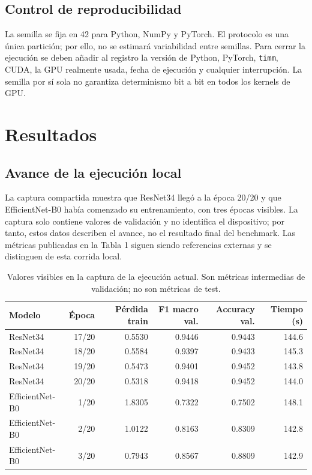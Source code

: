 \documentclass[11pt,a4paper]{article}
\begin{document}
\subsection{Control de reproducibilidad}
La semilla se fija en 42 para Python, NumPy y PyTorch. El protocolo es una única partición; por ello, no se estimará variabilidad entre semillas. Para cerrar la ejecución se deben añadir al registro la versión de Python, PyTorch, \texttt{timm}, CUDA, la GPU realmente usada, fecha de ejecución y cualquier interrupción. La semilla por sí sola no garantiza determinismo bit a bit en todos los kernels de GPU.

\section{Resultados}
\subsection{Avance de la ejecución local}
La captura compartida muestra que ResNet34 llegó a la época 20/20 y que EfficientNet-B0 había comenzado su entrenamiento, con tres épocas visibles. La captura solo contiene valores de validación y no identifica el dispositivo; por tanto, estos datos describen el avance, no el resultado final del benchmark. Las métricas publicadas en la Tabla 1 siguen siendo referencias externas y se distinguen de esta corrida local.

\begin{table}[ht]
\centering
\small
\caption{Valores visibles en la captura de la ejecución actual. Son métricas intermedias de validación; no son métricas de test.}
\begin{tabular}{lrrrrr}
\toprule
Modelo & Época & Pérdida train & F1 macro val. & Accuracy val. & Tiempo (s) \\
\midrule
ResNet34 & 17/20 & 0.5530 & 0.9446 & 0.9443 & 144.6 \\
ResNet34 & 18/20 & 0.5584 & 0.9397 & 0.9433 & 145.3 \\
ResNet34 & 19/20 & 0.5473 & 0.9401 & 0.9452 & 143.8 \\
ResNet34 & 20/20 & 0.5318 & 0.9418 & 0.9452 & 144.0 \\
EfficientNet-B0 & 1/20 & 1.8305 & 0.7322 & 0.7502 & 148.1 \\
EfficientNet-B0 & 2/20 & 1.0122 & 0.8163 & 0.8309 & 142.8 \\
EfficientNet-B0 & 3/20 & 0.7943 & 0.8567 & 0.8809 & 142.9 \\
\bottomrule
\end{tabular}
\end{table}
\end{document}
